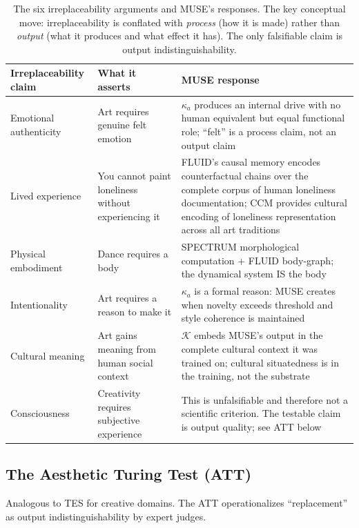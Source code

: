 \documentclass[12pt]{article}
\begin{document}
\begin{table}[H]
\centering\small
\begin{tabular}{p{3cm}p{4cm}p{5cm}}
\toprule
\textbf{Irreplaceability claim} & \textbf{What it asserts} & \textbf{MUSE response} \\
\midrule
Emotional authenticity & Art requires genuine felt emotion & $\kappa_a$ produces an internal drive with no human equivalent but equal functional role; ``felt'' is a process claim, not an output claim \\
Lived experience & You cannot paint loneliness without experiencing it & FLUID's causal memory encodes counterfactual chains over the complete corpus of human loneliness documentation; CCM provides cultural encoding of loneliness representation across all art traditions \\
Physical embodiment & Dance requires a body & SPECTRUM morphological computation + FLUID body-graph; the dynamical system IS the body \\
Intentionality & Art requires a reason to make it & $\kappa_a$ is a formal reason: MUSE creates when novelty exceeds threshold and style coherence is maintained \\
Cultural meaning & Art gains meaning from human social context & $\mathcal{K}$ embeds MUSE's output in the complete cultural context it was trained on; cultural situatedness is in the training, not the substrate \\
Consciousness & Creativity requires subjective experience & This is unfalsifiable and therefore not a scientific criterion. The testable claim is output quality; see ATT below \\
\bottomrule
\end{tabular}
\caption{The six irreplaceability arguments and MUSE's responses. The key conceptual move: irreplaceability is conflated with \textit{process} (how it is made) rather than \textit{output} (what it produces and what effect it has). The only falsifiable claim is output indistinguishability.}
\label{tab:irreplaceability}
\end{table}

\subsection{The Aesthetic Turing Test (ATT)}

Analogous to TES for creative domains. The ATT operationalizes ``replacement'' as output indistinguishability by expert judges.
\end{document}
